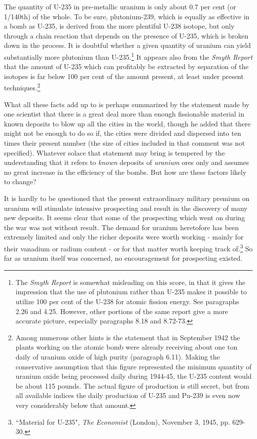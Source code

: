 The quantity of U-235 in pre-metallic uranium is only about 0.7 per cent (or 1/140th) of the whole. To be sure, plutonium-239, which is equally as effective in a bomb as U-235, is derived from the more plentiful U-238 isotope, but only through a chain reaction that depends on the presence of U-235, which is broken down in the process. It is doubtful whether a given quantity of uranium can yield substantially more plutonium than U-235.\footnote{The \emph{Smyth Report} is somewhat misleading on this score, in that it gives the impression that the use of plutonium rather than U-235 makes it possible to utilize 100 per cent of the U-238 for atomic fission energy. See paragraphs 2.26 and 4.25. However, other portions of the same report give a more accurate picture, especially paragraphs 8.18 and 8.72-73.} It appears also from the \emph{Smyth Report} that the amount of U-235 which can profitably be extracted by separation of the isotopes is far below 100 per cent of the amount present, at least under present techniques.\footnote{Among numerous other hints is the statement that in September 1942 the plants working on the atomic bomb were already receiving about one ton daily of uranium oxide of high purity (paragraph 6.11). Making the conservative assumption that this figure represented the minimum quantity of uranium oxide being processed daily during 1944-45, the U-235 content would be about 115 pounds. The actual figure of production is still secret, but from all available indices the daily production of U-235 and Pu-239 is even now very considerably below that amount.}

What all these facts add up to is perhaps summarized by the statement made by one scientist that there is a great deal more than enough fissionable material in known deposits to blow up all the cities in the world, though he added that there might not be enough to do so if, the cities were divided and dispersed into ten times their present number (the size of cities included in that comment was not specified). Whatever solace that statement may bring is tempered by the understanding that it refers to \emph{known} deposits of \emph{uranium} ores only and assumes no great increase in the efficiency of the bombs. But how are these factors likely to change?

It is hardly to be questioned that the present extraordinary military premium on uranium will stimulate intensive prospecting and result in the discovery of many new deposits. It seems clear that some of the prospecting which went on during the war was not without result. The demand for uranium heretofore has been extremely limited and only the richer deposits were worth working - mainly for their vanadium or radium content - or for that matter worth keeping track of.\footnote{``Material for U-235", \textit{The Economist} (London), November 3, 1945, pp. 629-30.} So far as uranium itself was concerned, no encouragement for prospecting existed.

